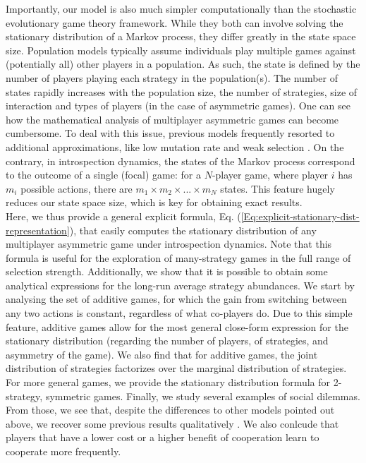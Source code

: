 \documentclass[11pt]{article}
\theoremstyle{plainCl1}
\theoremstyle{plainCl2}
\begin{document}
\noindent Importantly, our model is also much simpler computationally than the stochastic evolutionary game theory framework. While they both can involve solving the stationary distribution of a Markov process, they differ greatly in the state space size. Population models typically assume individuals play multiple games against (potentially all) other players in a population. As such, the state is defined by the number of players playing each strategy in the population(s). The number of states rapidly increases with the population size, the number of strategies, size of interaction and types of players (in the case of asymmetric games). One can see how the mathematical analysis of multiplayer asymmetric games can become cumbersome. To deal with this issue, previous models frequently resorted to additional approximations, like low mutation rate \cite{Fudenberg:JET:2006, Veller:JET:2016} and weak selection \cite{Wild:JTB:2007}. 
On the contrary, in introspection dynamics, the states of the Markov process correspond to the outcome of a single (focal) game: for a $N$-player game, where player $i$ has $m_i$ possible actions, there are $m_1 \times m_2 \times ... \times m_N$ states. This feature hugely reduces our state space size, which is key for obtaining exact results.  \\


\noindent Here, we thus provide a general explicit formula, Eq. (\ref{Eq:explicit-stationary-dist-representation}), that easily computes the stationary distribution of any multiplayer asymmetric game under introspection dynamics. Note that this formula is useful for the exploration of many-strategy games in the full range of selection strength.
Additionally, we show that it is possible to obtain some analytical expressions for the long-run average strategy abundances.
We start by analysing the set of additive games, for which the gain from switching between any two actions is constant, regardless of what co-players do. 
Due to this simple feature, additive games allow for the most general close-form expression for the stationary distribution (regarding the number of players, of strategies, and asymmetry of the game). 
We also find that for additive games, the joint distribution of strategies factorizes over the marginal distribution of strategies. 
For more general games, we provide the stationary distribution formula for 2-strategy, symmetric games.
Finally, we study several examples of social dilemmas. From those, we see that, despite the differences to other models pointed out above, we recover some previous results qualitatively \cite{Hauert:JTB:2006a}. We also conlcude that players that have a lower cost or a higher benefit of cooperation learn to cooperate more frequently. \\ 
\end{document}
